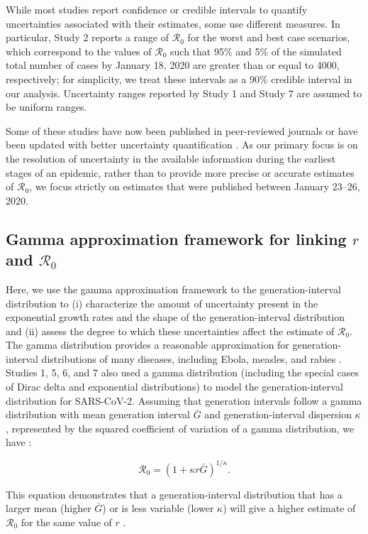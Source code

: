 \documentclass[12pt]{article}
\newcommand{\Ro}{\ensuremath{{\mathcal R}_{0}}\xspace}
\begin{document}
While most studies report confidence or credible intervals to quantify uncertainties associated with their estimates, some use different measures.
In particular, Study 2 reports a range of \Ro for the worst and best case scenarios, which correspond to the values of \Ro such that 95\% and 5\% of the simulated total number of cases by January 18, 2020 are greater than or equal to 4000, respectively;
for simplicity, we treat these intervals as a 90\% credible interval in our analysis.
Uncertainty ranges reported by Study 1 and Study 7 are assumed to be uniform ranges.

Some of these studies have now been published in peer-reviewed journals \citep{riou2020pattern, zhao2020preliminary} or have been updated with better uncertainty quantification \citep{readncov2}.
As our primary focus is on the resolution of uncertainty in the available information during the earliest stages of an epidemic, rather than to provide more precise or accurate estimates of \Ro, we focus strictly on estimates that were published between January 23--26, 2020.

\subsection{Gamma approximation framework for linking $r$ and $\Ro$}

Here, we use the gamma approximation framework to the generation-interval distribution \citep{nishiura2009transmission, mcbryde2009early, roberts2011early, trichereau2012estimation, nishiura2015theoretical, park2019practical} to (i) characterize the amount of uncertainty present in the exponential growth rates and the shape of the generation-interval distribution and (ii) assess the degree to which these uncertainties affect the estimate of \Ro.
The gamma distribution provides a reasonable approximation for generation-interval distributions of many diseases, including Ebola, measles, and rabies \citep{park2019practical}.
Studies 1, 5, 6, and 7 also used a gamma distribution (including the special cases of Dirac delta and exponential distributions) to model the generation-interval distribution for SARS-CoV-2.
Assuming that generation intervals follow a gamma distribution with mean generation interval $\bar G$ and generation-interval dispersion $\kappa$, represented by the squared coefficient of variation of a gamma distribution, we have \citep{park2019practical}:
\begin{linenomath*}
\begin{equation}
\Ro = \left(1 + \kappa r \bar{G}\right)^{1/\kappa}.
\label{eq:gamma}
\end{equation}
\end{linenomath*}
This equation demonstrates that a generation-interval distribution that has a larger mean (higher $\bar{G}$) or is less variable (lower $\kappa$) will give a higher estimate of \Ro for the same value of $r$ \citep{wallinga2007generation}.
\end{document}
